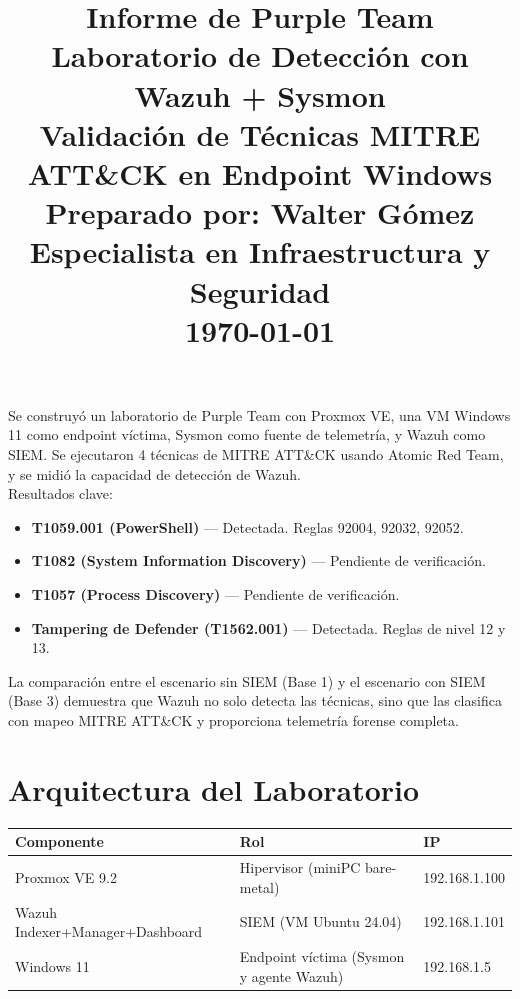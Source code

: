\documentclass[11pt,a4paper]{article}
\title{
	\vspace{-1.5cm}
	\textbf{\Huge Informe de Purple Team}\\[0.4cm]
	\Large Laboratorio de Detección con Wazuh + Sysmon\\[0.3cm]
	\large Validación de Técnicas MITRE ATT\&CK en Endpoint Windows\\[0.5cm]
	\normalsize Preparado por: Walter Gómez\\
	\normalsize Especialista en Infraestructura y Seguridad\\
	\normalsize \today
}
\date{}
\begin{document}
	
	\maketitle
	\thispagestyle{empty}
	
	\begin{infobox}
		Se construyó un laboratorio de Purple Team con Proxmox VE, una VM Windows 11 como endpoint víctima, Sysmon como fuente de telemetría, y Wazuh como SIEM. Se ejecutaron 4 técnicas de MITRE ATT\&CK usando Atomic Red Team, y se midió la capacidad de detección de Wazuh. \\
		
		Resultados clave:
		\begin{itemize}[leftmargin=1.5em]
			\item \textbf{T1059.001 (PowerShell)} --- Detectada. Reglas 92004, 92032, 92052.
			\item \textbf{T1082 (System Information Discovery)} --- Pendiente de verificación.
			\item \textbf{T1057 (Process Discovery)} --- Pendiente de verificación.
			\item \textbf{Tampering de Defender (T1562.001)} --- Detectada. Reglas de nivel 12 y 13.
		\end{itemize}
		
		La comparación entre el escenario sin SIEM (Base 1) y el escenario con SIEM (Base 3) demuestra que Wazuh no solo detecta las técnicas, sino que las clasifica con mapeo MITRE ATT\&CK y proporciona telemetría forense completa.
	\end{infobox}
	
	\vspace{0.5cm}
	
	\tableofcontents
	
	\newpage
	
	\section{Arquitectura del Laboratorio}
	
	\begin{table}[h]
		\centering
		\begin{tabular}{@{}lll@{}}
			\toprule
			\textbf{Componente} & \textbf{Rol} & \textbf{IP} \\ \midrule
			Proxmox VE 9.2 & Hipervisor (miniPC bare-metal) & 192.168.1.100 \\
			Wazuh Indexer+Manager+Dashboard & SIEM (VM Ubuntu 24.04) & 192.168.1.101 \\
			Windows 11 & Endpoint víctima (Sysmon y agente Wazuh) & 192.168.1.5 \\
			\bottomrule
		\end{tabular}
	\end{table}
	
\end{document}
